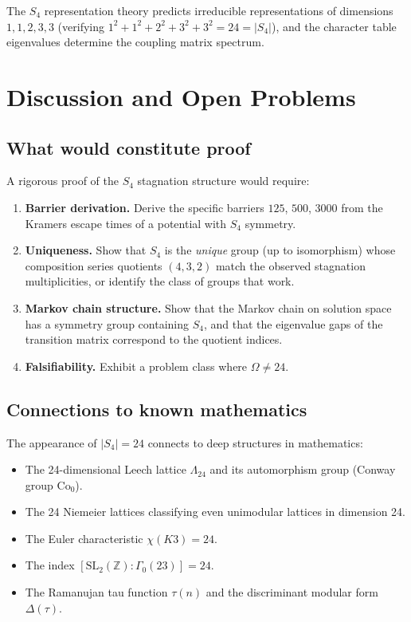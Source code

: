 \documentclass[11pt]{amsart}
\theoremstyle{definition}
\begin{document}
The $S_4$ representation theory predicts irreducible representations of dimensions $1, 1, 2, 3, 3$ (verifying $1^2 + 1^2 + 2^2 + 3^2 + 3^2 = 24 = |S_4|$), and the character table eigenvalues determine the coupling matrix spectrum.


\section{Discussion and Open Problems}
\label{sec:discussion}

\subsection{What would constitute proof}

A rigorous proof of the $S_4$ stagnation structure would require:
\begin{enumerate}[label=\textbf{P\arabic*.}]
\item \textbf{Barrier derivation.} Derive the specific barriers $125$, $500$, $3000$ from the Kramers escape times of a potential with $S_4$ symmetry.
\item \textbf{Uniqueness.} Show that $S_4$ is the \emph{unique} group (up to isomorphism) whose composition series quotients $(4, 3, 2)$ match the observed stagnation multiplicities, or identify the class of groups that work.
\item \textbf{Markov chain structure.} Show that the Markov chain on solution space has a symmetry group containing $S_4$, and that the eigenvalue gaps of the transition matrix correspond to the quotient indices.
\item \textbf{Falsifiability.} Exhibit a problem class where $\Omega \neq 24$.
\end{enumerate}

\subsection{Connections to known mathematics}

The appearance of $|S_4| = 24$ connects to deep structures in mathematics:
\begin{itemize}
\item The 24-dimensional Leech lattice $\Lambda_{24}$ and its automorphism group (Conway group $\mathrm{Co}_0$).
\item The 24 Niemeier lattices classifying even unimodular lattices in dimension 24.
\item The Euler characteristic $\chi(K3) = 24$.
\item The index $[\mathrm{SL}_2(\mathbb{Z}) : \Gamma_0(23)] = 24$.
\item The Ramanujan tau function $\tau(n)$ and the discriminant modular form $\Delta(\tau)$.
\end{itemize}
\end{document}
